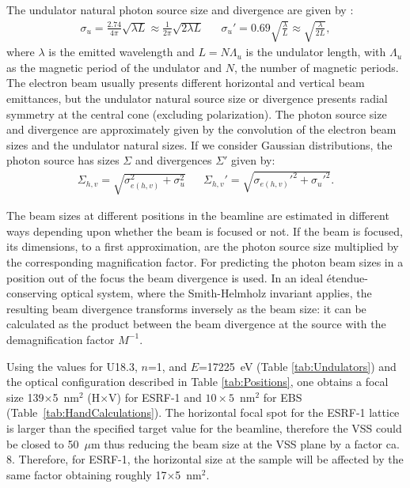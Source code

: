 \documentclass{iucr}              %
\newcommand{\inred}[1]{{\color{red}#1}}
\begin{document}
The undulator natural photon source size and divergence are given by \cite{elleaume}:
\begin{align}
    \label{eq:photon small sigmas}
    \sigma_u=\frac{2.74}{4\pi}\sqrt{\lambda L}\approx \frac{1}{2  \pi}\sqrt{2 \lambda L}  && \sigma_u' = 0.69\sqrt{\frac{\lambda}{L}}\approx \sqrt{\frac{\lambda}{2 L}},
\end{align}
where $\lambda$ is the emitted wavelength and $L=N\Lambda_u$ is the undulator length, with $\Lambda_u$ as the magnetic period of the undulator and $N$, the number of magnetic periods. The electron beam usually presents different horizontal and vertical beam emittances, but the undulator natural source size or divergence presents radial symmetry at the central cone (excluding polarization). The photon source size and divergence are approximately given by the convolution of the electron beam sizes and the undulator natural sizes. If we consider Gaussian distributions, the photon source has sizes $\Sigma$ and divergences $\Sigma'$ given by:
\begin{align}
\label{eq:photon big sigmas}
\Sigma_{h,v}=\sqrt{\sigma_{e(h,v)}^2 + \sigma_u^2} && \Sigma_{h,v}'=\sqrt{\sigma_{e(h,v)}'^2 + \sigma_u'^2}.
\end{align}

The beam sizes at different positions in the beamline are estimated in different ways depending upon whether the beam is focused or not. If the beam is focused, its dimensions, to a first approximation, are the photon source size multiplied by the corresponding magnification factor. For predicting the photon beam sizes in a position out of the focus the beam divergence is used. In an ideal {\'{e}}tendue-conserving optical system, where the Smith-Helmholz invariant applies, the resulting beam divergence transforms inversely as the beam size: it can be calculated as the product between the beam divergence at the source with the demagnification factor $M^{-1}$.

Using the values for U18.3, $n$=1, and  $E$=17225~eV (Table \ref{tab:Undulators}) and the optical configuration described in Table \ref{tab:Positions}, one obtains a focal size 139$\times$5~nm$^2$ (H$\times$V) for ESRF-1 and $10\times5$~nm$^2$ for EBS (Table~\ref{tab:HandCalculations}). The horizontal focal spot for the ESRF-1 lattice is larger than the specified target value for the beamline, therefore the VSS could be closed to 50~$\mu$m thus reducing the beam size at the VSS plane by a factor ca. 8.
Therefore, for ESRF-1, the horizontal size at the sample will be affected by the same factor obtaining roughly 17$\times$5~nm$^2$.
\end{document}
